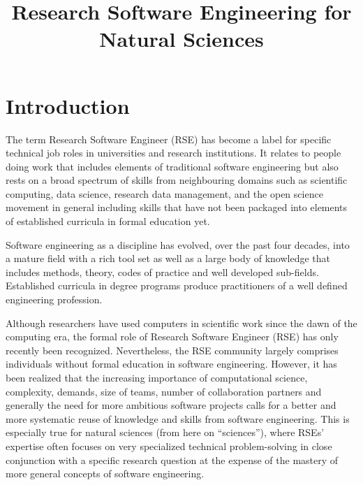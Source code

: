 \documentclass[
        twocolumn,german,biblatex
    ]{article}
\title{Research Software Engineering for Natural Sciences}
\author[]{ \orcidlink{}}
\affil[]{}
\author[]{ \orcidlink{}}
\affil[]{}
\author[]{ \orcidlink{}}
\affil[]{}
\author[]{ \orcidlink{}}
\affil[]{}
\author[]{ \orcidlink{}}
\affil[]{}
\author[]{ \orcidlink{}}
\affil[]{}
\author[]{ \orcidlink{}}
\affil[]{}
\author[]{ \orcidlink{}}
\affil[]{}
\date{}
\begin{document}
    \maketitle



    \section{Introduction}\label{introduction}

    The term Research Software Engineer (RSE) has become a label for
    specific technical job roles in universities and research
    institutions. It relates to people doing work that includes elements
    of traditional software engineering but also rests on a broad
    spectrum of skills from neighbouring domains such as scientific
    computing, data science, research data management, and the open
    science movement in general including skills that have not been
    packaged into elements of established curricula in formal education
    yet.

    Software engineering as a discipline has evolved, over the past four
    decades, into a mature field with a rich tool set as well as a large
    body of knowledge that includes methods, theory, codes of practice
    and well developed sub-fields. Established curricula in degree
    programs produce practitioners of a well defined engineering
    profession.

    Although researchers have used computers in scientific work since
    the dawn of the computing era, the formal role of Research Software
    Engineer (RSE) has only recently been recognized. Nevertheless, the
    RSE community largely comprises individuals without formal education
    in software engineering. However, it has been realized that the
    increasing importance of computational science, complexity, demands,
    size of teams, number of collaboration partners and generally the
    need for more ambitious software projects calls for a better and
    more systematic reuse of knowledge and skills from software
    engineering. This is especially true for natural sciences (from here
    on ``sciences''), where RSEs' expertise often focuses on very
    specialized technical problem-solving in close conjunction with a
    specific research question at the expense of the mastery of more
    general concepts of software engineering.
\end{document}
